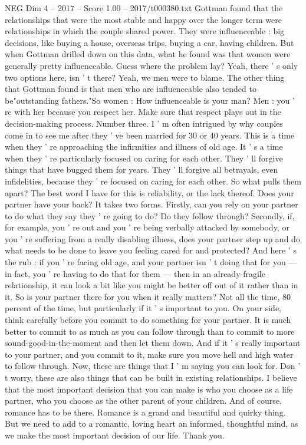 \begin{textsample}{NEG Dim 4 – 2017 – Score 1.00 – 2017/t000380.txt}
Gottman found that the relationships that were the most stable and happy over the longer term were relationships in which the couple shared power.
They were influenceable : big decisions, like buying a house, overseas trips, buying a car, having children.
But when Gottman drilled down on this data, what he found was that women were generally pretty influenceable.
Guess where the problem lay?
Yeah, there ' s only two options here, isn ' t there?
Yeah, we men were to blame.
The other thing that Gottman found is that men who are influenceable also tended to be"outstanding fathers."So women : How influenceable is your man?
Men : you ' re with her because you respect her.
Make sure that respect plays out in the decision-making process.
Number three.
I ' m often intrigued by why couples come in to see me after they ' ve been married for 30 or 40 years.
This is a time when they ' re approaching the infirmities and illness of old age.
It ' s a time when they ' re particularly focused on caring for each other.
They ' ll forgive things that have bugged them for years.
They ' ll forgive all betrayals, even infidelities, because they ' re focused on caring for each other.
So what pulls them apart?
The best word I have for this is reliability, or the lack thereof.
Does your partner have your back?
It takes two forms.
Firstly, can you rely on your partner to do what they say they ' re going to do?
Do they follow through?
Secondly, if, for example, you ' re out and you ' re being verbally attacked by somebody, or you ' re suffering from a really disabling illness, does your partner step up and do what needs to be done to leave you feeling cared for and protected?
And here ' s the rub : if you ' re facing old age, and your partner isn ' t doing that for you — in fact, you ' re having to do that for them — then in an already-fragile relationship, it can look a bit like you might be better off out of it rather than in it.
So is your partner there for you when it really matters?
Not all the time, 80 percent of the time, but particularly if it ' s important to you.
On your side, think carefully before you commit to do something for your partner.
It is much better to commit to as much as you can follow through than to commit to more sound-good-in-the-moment and then let them down.
And if it ' s really important to your partner, and you commit to it, make sure you move hell and high water to follow through.
Now, these are things that I ' m saying you can look for.
Don ' t worry, these are also things that can be built in existing relationships.
I believe that the most important decision that you can make is who you choose as a life partner, who you choose as the other parent of your children.
And of course, romance has to be there.
Romance is a grand and beautiful and quirky thing.
But we need to add to a romantic, loving heart an informed, thoughtful mind, as we make the most important decision of our life.
Thank you.

\end{textsample}
